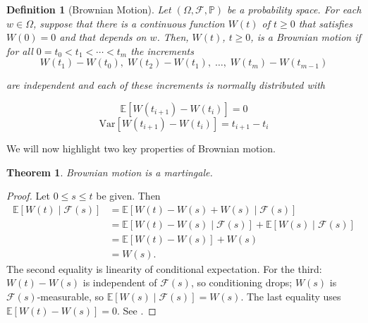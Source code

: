 \documentclass[11pt, a4paper]{article}
\newtheorem{theorem}{Theorem}
\newtheorem{definition}{Definition}
\numberwithin{equation}{subsection}
\numberwithin{definition}{subsection}
\numberwithin{theorem}{subsection}
\numberwithin{remark}{subsection}
\begin{document}
\begin{definition}[Brownian Motion]
Let \((\Omega, \mathcal{F},\mathbb{P})\) be a probability space. For each \(w \in \Omega\), suppose that there is a continuous function \(W(t)\) of \(t \geq 0\) that satisfies \(W(0) = 0\) and that depends on \(w\). Then, \(W(t)\), \(t \geq 0\), is a \textup{Brownian motion} if for all \(0 = t_0 < t_1 < \cdots < t_m\) the increments
    \begin{equation}
    W(t_1) - W(t_0),\; W(t_2) - W(t_1),\; \ldots,\; W(t_m) - W(t_{m-1})
    \end{equation}

    are independent and each of these increments is normally distributed with

    \begin{equation}
    \mathbb{E}[W(t_{i+1}) - W(t_{i})] = 0
    \end{equation}
    \begin{equation}
    \mathrm{Var}[W(t_{i+1}) - W(t_{i})] = t_{i+1} - t_i
    \end{equation}

\end{definition} 

We will now highlight two key properties of Brownian motion.

\begin{theorem}
Brownian motion is a martingale.
\end{theorem}

\begin{proof}
Let \(0 \leq s \leq t\) be given. Then
    \begin{align*}
    \mathbb{E}[W(t) \mid \mathcal{F}(s)] &= \mathbb{E}[W(t) - W(s) + W(s) \mid \mathcal{F}(s)] \\
                                         &= \mathbb{E}[W(t) - W(s) \mid \mathcal{F}(s)] + \mathbb{E}[W(s) \mid \mathcal{F}(s)] \\
                                         &= \mathbb{E}[W(t) - W(s)] + W(s) \\
                                         &= W(s).
    \end{align*}
The second equality is linearity of conditional expectation. For the third: \(W(t) - W(s)\) is independent of \(\mathcal{F}(s)\), so conditioning drops; \(W(s)\) is \(\mathcal{F}(s)\)-measurable, so \(\mathbb{E}[W(s)\mid\mathcal{F}(s)] = W(s)\). The last equality uses \(\mathbb{E}[W(t)-W(s)] = 0\). See \cite[p.~98]{shreve2004}.
\end{proof}
\end{document}
